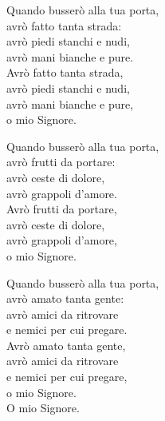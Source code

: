 
\strofa Quando busserò alla tua porta,\\
avrò fatto tanta strada:\\
avrò piedi stanchi e nudi,\\
avrò mani bianche e pure.\\
Avrò fatto tanta strada,\\
avrò piedi stanchi e nudi,\\
avrò mani bianche e pure,\\
o mio Signore.

\spazio

\strofa Quando busserò alla tua porta,\\
avrò frutti da portare:\\
avrò ceste di dolore,\\
avrò grappoli d'amore.\\
Avrò frutti da portare,\\
avrò ceste di dolore,\\
avrò grappoli d'amore,\\
o mio Signore.

\spazio

\strofa Quando busserò alla tua porta,\\
avrò amato tanta gente:\\
avrò amici da ritrovare\\
e nemici per cui pregare.\\
Avrò amato tanta gente,\\
avrò amici da ritrovare\\
e nemici per cui pregare,\\
o mio Signore.\\
O mio Signore.
